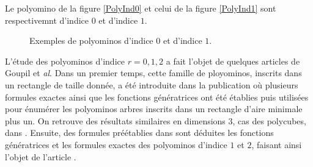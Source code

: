 \begin{Ex}\label{expolyind0}
Le polyomino de la figure \ref{PolyInd0} et celui de la figure \ref{PolyInd1} sont respectivemnt d'indice $0$  et d'indice $1$.
\begin{figure}[!htb]
\begin{minipage}[c]{.06\linewidth}
 \centering
\end{minipage}\hfill
\begin{minipage}[c]{.36\linewidth}
 \centering
 \begin{minipage}[c]{.26\linewidth}
 \centering
 \end{minipage}\hfill
 \begin{minipage}[c]{.66\linewidth}
 \centering
\begin{logicpuzzle}[rows=5,columns=4,color=cyan!100, width=750px,scale=0.5]
\framepuzzle[black!50]
\end{logicpuzzle}
\end{minipage}
\end{minipage}
 \hfill
 \begin{minipage}[c]{.46\linewidth}
 \centering
 \begin{minipage}[c]{.06\linewidth}
 \centering
\end{minipage}\hfill
\begin{minipage}[c]{.76\linewidth}
 \centering
\begin{logicpuzzle}[rows=5,columns=4,color=cyan!100, width=750px,scale=0.5]
\framepuzzle[black!50]
\end{logicpuzzle}
\end{minipage}
\end{minipage}
\caption{\label{figPIND}Exemples de polyominos d'indice $0$ et d'indice $1$.}
\end{figure}
\end{Ex} 

L'étude des polyominos d'indice $r=0,1,2$ a fait l'objet de quelques articles de Goupil et \emph{al}. Dans un premier temps, cette famille de ployominos, inscrits dans un rectangle de taille donnée, a été introduite dans la publication \cite{Goup2} où plusieurs formules exactes ainsi que les fonctions génératrices ont été établies puis utilisées pour énumérer les polyominos arbres  inscrits dans un rectangle d'aire minimale plus un. On retrouve des résultats similaires en dimensions $3$, cas des polycubes, dans \cite{Goup1}. Ensuite, des formules préétablies dans \cite{Goup2} sont déduites les fonctions génératrices et les formules exactes des polyominos  d'indice $1$ et $2$, faisant ainsi l'objet de l'article \cite{Goup3}.

